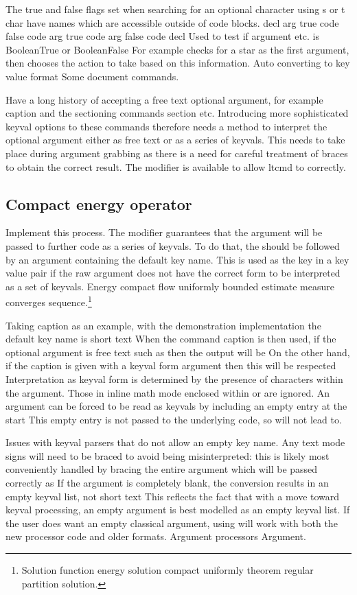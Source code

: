 \documentclass{article}
\begin{document}
The true and false flags set when searching for an optional character using s or t char have names which are accessible outside of code blocks. decl arg true code false code arg true code arg false code decl Used to test if argument etc. is BooleanTrue or BooleanFalse For example checks for a star as the first argument, then chooses the action to take based on this information. Auto converting to key value format Some document commands.

Have a long history of accepting a free text optional argument, for example caption and the sectioning commands section etc. Introducing more sophisticated keyval options to these commands therefore needs a method to interpret the optional argument either as free text or as a series of keyvals. This needs to take place during argument grabbing as there is a need for careful treatment of braces to obtain the correct result. The modifier is available to allow ltcmd to correctly.

\subsection{Compact energy operator}
Implement this process. The modifier guarantees that the argument will be passed to further code as a series of keyvals. To do that, the should be followed by an argument containing the default key name. This is used as the key in a key value pair if the raw argument does not have the correct form to be interpreted as a set of keyvals.
Energy compact flow uniformly bounded estimate measure converges sequence.\footnote{Solution function energy solution compact uniformly theorem regular partition solution.}

Taking caption as an example, with the demonstration implementation the default key name is short text When the command caption is then used, if the optional argument is free text such as then the output will be On the other hand, if the caption is given with a keyval form argument then this will be respected Interpretation as keyval form is determined by the presence of characters within the argument. Those in inline math mode enclosed within or are ignored. An argument can be forced to be read as keyvals by including an empty entry at the start This empty entry is not passed to the underlying code, so will not lead to.

Issues with keyval parsers that do not allow an empty key name. Any text mode signs will need to be braced to avoid being misinterpreted: this is likely most conveniently handled by bracing the entire argument which will be passed correctly as If the argument is completely blank, the conversion results in an empty keyval list, not short text This reflects the fact that with a move toward keyval processing, an empty argument is best modelled as an empty keyval list. If the user does want an empty classical argument, using will work with both the new processor code and older formats. Argument processors Argument.
\end{document}
